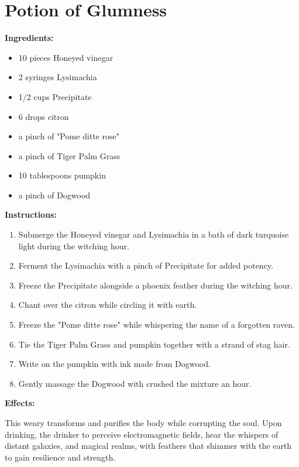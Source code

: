 \documentclass{article}
\begin{document}
\newpage
\section*{Potion of Glumness}

\textbf{Ingredients:}

\begin{itemize}
  \item 10 pieces Honeyed vinegar
  \item 2 syringes Lysimachia
  \item 1/2 cups Precipitate
  \item 6 drops citron
  \item a pinch of "Pome ditte rose"
  \item a pinch of Tiger Palm Grass
  \item 10 tablespoons pumpkin
  \item a pinch of Dogwood
\end{itemize}

\textbf{Instructions:}

\begin{enumerate}
  \item Submerge the Honeyed vinegar and Lysimachia in a bath of dark turquoise light during the witching hour.
  \item Ferment the Lysimachia with a pinch of Precipitate for added potency.
  \item Freeze the Precipitate alongside a phoenix feather during the witching hour.
  \item Chant over the citron while circling it with earth.
  \item Freeze the "Pome ditte rose" while whispering the name of a forgotten raven.
  \item Tie the Tiger Palm Grass and pumpkin together with a strand of stag hair.
  \item Write on the pumpkin with ink made from Dogwood.
  \item Gently massage the Dogwood with crushed the mixture an hour.
\end{enumerate}

\textbf{Effects:}

This weary transforms and purifies the body while corrupting the soul. Upon drinking, the drinker to perceive electromagnetic fields, hear the whispers of distant galaxies, and magical realms, with feathers that shimmer with the earth to gain resilience and strength.
\end{document}
